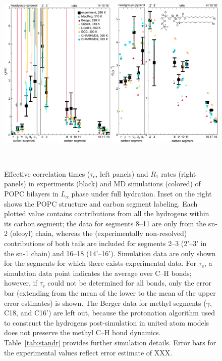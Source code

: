 \documentclass[journal=jpcbfk,manuscript=article,layout=twocolumn]{achemso}
\begin{document}
\begin{figure}[!ht]
\centering
\includegraphics[width=\textwidth]{./figures/normalcond_2020_3.pdf}
\caption{Effective correlation times ($\tau_\mathrm{e}$, left panels) and $R_{1}$ rates (right panels) in experiments (black) and MD simulations (colored) of POPC bilayers in $L_{\alpha}$ phase under full hydration.
Inset on the right shows the POPC structure and carbon segment labeling.
Each plotted value contains contributions from all the hydrogens within its carbon segment; the data for segments 8--11 are only from the sn-2 (oleoyl) chain, whereas the (experimentally non-resolved) contributions of both tails are included for segments 2--3 (2'--3' in the sn-1 chain) and 16--18 (14'--16').
%
Simulation data are only shown for the segments for which there exists experimental data.
%
For $\tau_\mathrm{e}$,
a simulation data point indicates the average over C--H bonds; however,
if $\tau_\mathrm{e}$ could not be determined for all bonds, only the error bar
(extending from the mean of the lower to the mean of the upper error estimates) is shown.
%
The Berger data for methyl segments ($\gamma$, C18, and C16') are left out, because the protonation algorithm used to construct the hydrogens post-simulation in united atom models does not preserve the methyl C--H bond dynamics.
%
Table~\ref{tab:standr} provides further simulation details.
%
Error bars for the experimental values reflect error estimate of {\color{red}XXX}.
}
\label{fig:teff_R1}

\\

\end{figure}
\end{document}
